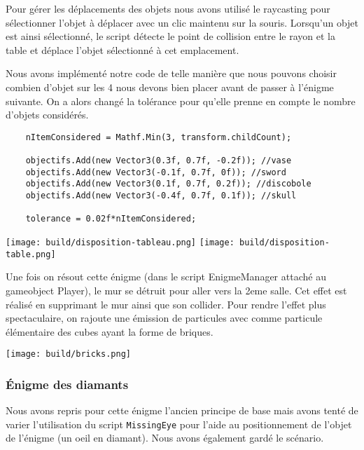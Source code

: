 \documentclass[12pt]{article}
\begin{document}
Pour gérer les déplacements des objets nous avons utilisé le raycasting pour sélectionner l’objet à déplacer avec un clic maintenu sur la souris. Lorsqu’un objet est ainsi sélectionné, le script détecte le point de collision entre le rayon et la table et déplace l’objet sélectionné à cet emplacement.

Nous avons implémenté notre code de telle manière que nous pouvons choisir combien d'objet sur les 4 nous devons bien placer avant de passer à l'énigme suivante. On a alors changé la tolérance pour qu'elle prenne en compte le nombre d'objets considérés.

\begin{verbatim}
    nItemConsidered = Mathf.Min(3, transform.childCount);

    objectifs.Add(new Vector3(0.3f, 0.7f, -0.2f)); //vase
    objectifs.Add(new Vector3(-0.1f, 0.7f, 0f)); //sword
    objectifs.Add(new Vector3(0.1f, 0.7f, 0.2f)); //discobole
    objectifs.Add(new Vector3(-0.4f, 0.7f, 0.1f)); //skull

    tolerance = 0.02f*nItemConsidered;
\end{verbatim}

\begin{center}
    \texttt{[image: build/disposition-tableau.png]}
    \texttt{[image: build/disposition-table.png]}
\end{center}

Une fois on résout cette énigme (dans le script EnigmeManager attaché au gameobject Player), le mur se détruit pour aller vers la 2eme salle. Cet effet est réalisé en supprimant le mur ainsi que son collider. Pour rendre l'effet plus spectaculaire, on rajoute une émission de particules avec comme particule élémentaire des cubes ayant la forme de briques.

\begin{center}
    \texttt{[image: build/bricks.png]}
\end{center}

\subsubsection{Énigme des diamants}
Nous avons repris pour cette énigme l’ancien principe de base mais avons tenté de varier l’utilisation du script \verb!MissingEye! pour l’aide au positionnement de l’objet de l’énigme (un oeil en diamant). Nous avons également gardé le scénario.
\end{document}
